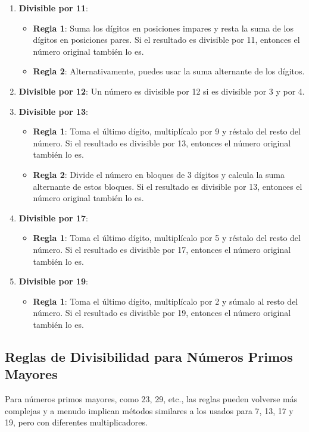 \begin{enumerate}
	\item \textbf{Divisible por 11}:
	\begin{itemize}
		\item \textbf{Regla 1}: Suma los dígitos en posiciones impares y resta la suma de los dígitos en posiciones pares. Si el resultado es divisible por 11, entonces el número original también lo es.
		\item \textbf{Regla 2}: Alternativamente, puedes usar la suma alternante de los dígitos.
	\end{itemize}
	\item \textbf{Divisible por 12}: Un número es divisible por 12 si es divisible por 3 y por 4.
	\item \textbf{Divisible por 13}:
	\begin{itemize}
		\item \textbf{Regla 1}: Toma el último dígito, multiplícalo por 9 y réstalo del resto del número. Si el resultado es divisible por 13, entonces el número original también lo es.
		\item \textbf{Regla 2}: Divide el número en bloques de 3 dígitos y calcula la suma alternante de estos bloques. Si el resultado es divisible por 13, entonces el número original también lo es.
	\end{itemize}
	\item \textbf{Divisible por 17}:
	\begin{itemize}
		\item \textbf{Regla 1}: Toma el último dígito, multiplícalo por 5 y réstalo del resto del número. Si el resultado es divisible por 17, entonces el número original también lo es.
	\end{itemize}
	\item \textbf{Divisible por 19}:
	\begin{itemize}
		\item \textbf{Regla 1}: Toma el último dígito, multiplícalo por 2 y súmalo al resto del número. Si el resultado es divisible por 19, entonces el número original también lo es.
	\end{itemize}
\end{enumerate}

\subsection{Reglas de Divisibilidad para Números Primos Mayores}

Para números primos mayores, como 23, 29, etc., las reglas pueden volverse más complejas y a menudo implican métodos similares a los usados para 7, 13, 17 y 19, pero con diferentes multiplicadores.

